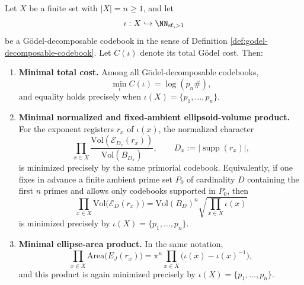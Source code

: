 \begin{theorem}\label{thm:primorial-min-total-godel-cost}
Let \(X\) be a finite set with \(|X|=n\ge 1\), and let
\[
\iota:X\hookrightarrow \NN_{\mathrm{sf},>1}
\]
be a G\"odel-decomposable codebook in the sense of Definition \ref{def:godel-decomposable-codebook}. Let \(C(\iota)\) denote its total G\"odel cost. Then:
\begin{enumerate}
  \item \textbf{Minimal total cost.}
  Among all G\"odel-decomposable codebooks,
  \[
  \min_{\iota}C(\iota)=\log(p_n\#),
  \]
  and equality holds precisely when \(\iota(X)=\{p_1,\dots,p_n\}\).

  \item \textbf{Minimal normalized and fixed-ambient ellipsoid-volume product.}
  For the exponent registers \(r_x\) of \(\iota(x)\), the normalized character
  \[
  \prod_{x\in X}\frac{\mathrm{Vol}(\mathcal E_{D_x}(r_x))}{\mathrm{Vol}(B_{D_x})},
  \qquad D_x:=|\operatorname{supp}(r_x)|,
  \]
  is minimized precisely by the same primorial codebook. Equivalently, if one fixes in advance a finite ambient prime set \(P_0\) of cardinality \(D\) containing the first \(n\) primes and allows only codebooks supported in \(P_0\), then
  \[
  \prod_{x\in X}\mathrm{Vol}\bigl(\mathcal E_D(r_x)\bigr)
  =\mathrm{Vol}(B_D)^n\sqrt{\prod_{x\in X}\iota(x)}
  \]
  is minimized precisely by \(\iota(X)=\{p_1,\dots,p_n\}\).

  \item \textbf{Minimal ellipse-area product.}
  In the same notation,
  \[
  \prod_{x\in X}\mathrm{Area}\bigl(E_J(r_x)\bigr)
  =
  \pi^n\prod_{x\in X}\bigl(\iota(x)-\iota(x)^{-1}\bigr),
  \]
  and this product is again minimized precisely by \(\iota(X)=\{p_1,\dots,p_n\}\).
\end{enumerate}
\end{theorem}

